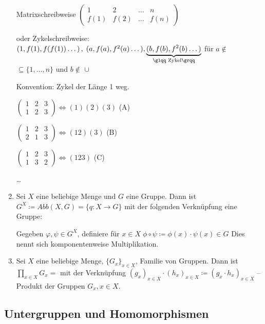 \documentclass[10pt,a4paper]{article}
\begin{document}
\begin{enumerate}
Matrixschreibweise $\begin{pmatrix}
1 & 2 & \dots & n\\
f(1) & f(2) & \dots & f(n)
\end{pmatrix}$ 

oder Zykelschreibweise: $\left(1, f(1), f(f(1)) \dots \right),\; (a, f(a), f^2(a) \dots), \underbrace{(b, f(b), f^2(b) \dots)}_{\text{\glqq Zykel\grqq}}$ für $a \notin$  $\subseteq \{1,\dots,n\}$ und $b \notin$  $\cup$ 

Konvention: Zykel der Länge 1 weg. \bigskip

$\begin{pmatrix}
1 & 2 & 3\\
1 & 2 & 3
\end{pmatrix} \Leftrightarrow (1)(2)(3)$ (A)

$\begin{pmatrix}
1 & 2 & 3\\
2 & 1 & 3
\end{pmatrix} \Leftrightarrow (12)(3)$ (B)

$\begin{pmatrix}
1 & 2 & 3\\
1 & 3 & 2 
\end{pmatrix} \Leftrightarrow (123)$ (C)

\dots

\item Sei $X$ eine beliebige Menge und $G$ eine Gruppe. Dann ist $G^X \coloneqq Abb(X,G) = \{q : X \to G\}$ mit der folgenden Verknüpfung eine Gruppe: 

Gegeben $\varphi, \psi \in G^X$, definiere für $x \in X \; \phi \circ \psi \coloneqq \phi(x) \cdot \psi(x) \in G$ Dies nennt sich \glqq komponentenweise Multiplikation\grqq .

\item Sei $X$ eine beliebige Menge, $\{G_x\}_{x \in X}$, Familie von Gruppen. Dann ist $\prod_{x \in X} G_x =$  mit der Verknüpfung $(g_x)_{x \in X} \cdot (h_x)_{x \in X} \coloneqq (g_x \cdot h_x)_{x \in X}$ -- Produkt der Gruppen $G_x, x \in X$.
\end{enumerate}\bigskip

\subsection{Untergruppen und Homomorphismen}
\end{document}
